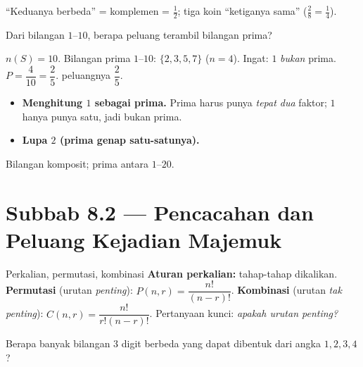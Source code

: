\begin{variasi}
``Keduanya berbeda'' = komplemen = $\frac12$; tiga koin ``ketiganya sama''
($\frac{2}{8}=\frac14$).
\end{variasi}

\begin{soalbox}{}
Dari bilangan $1$--$10$, berapa peluang terambil bilangan prima?
\end{soalbox}

\jawab
{} $n(S)=10$.
 Bilangan prima $1$--$10$: $\{2,3,5,7\}$ ($n=4$). Ingat: $1$
\emph{bukan} prima.
 $P=\dfrac{4}{10}=\dfrac25$.
\jadi peluangnya $\dfrac25$.

\begin{jebakan}
\begin{itemize}[leftmargin=*,topsep=2pt]
  \item \textbf{Menghitung $1$ sebagai prima.} Prima harus punya \emph{tepat
  dua} faktor; $1$ hanya punya satu, jadi bukan prima.
  \item \textbf{Lupa $2$ (prima genap satu-satunya).}
\end{itemize}
\end{jebakan}

\begin{variasi}
Bilangan komposit; prima antara $1$--$20$.
\end{variasi}

\section*{Subbab 8.2 — Pencacahan dan Peluang Kejadian Majemuk}

\begin{ingat}{Perkalian, permutasi, kombinasi}
\textbf{Aturan perkalian:} tahap-tahap dikalikan. \textbf{Permutasi} (urutan
\emph{penting}): $P(n,r)=\dfrac{n!}{(n-r)!}$. \textbf{Kombinasi} (urutan
\emph{tak penting}): $C(n,r)=\dfrac{n!}{r!(n-r)!}$. Pertanyaan kunci:
\emph{apakah urutan penting?}
\end{ingat}

\begin{soalbox}{}
Berapa banyak bilangan $3$ digit berbeda yang dapat dibentuk dari angka
$1,2,3,4$?
\end{soalbox}

